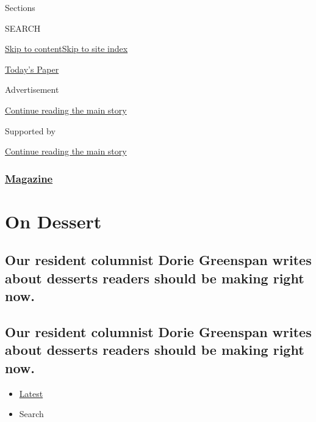 Sections

SEARCH

\protect\hyperlink{site-content}{Skip to
content}\protect\hyperlink{site-index}{Skip to site index}

\href{https://myaccount.nytimes3xbfgragh.onion/auth/login?response_type=cookie\&client_id=vi}{}

\href{https://www.nytimes3xbfgragh.onion/section/todayspaper}{Today's
Paper}

Advertisement

\protect\hyperlink{after-top}{Continue reading the main story}

Supported by

\protect\hyperlink{after-sponsor}{Continue reading the main story}

\hypertarget{magazine}{%
\subsubsection{\texorpdfstring{\href{/section/magazine}{Magazine}}{Magazine}}\label{magazine}}

\hypertarget{on-dessert}{%
\section{On Dessert}\label{on-dessert}}

\hypertarget{our-resident-columnist-dorie-greenspan-writes-about-desserts-readers-should-be-making-right-now}{%
\subsection{Our resident columnist Dorie Greenspan writes about desserts
readers should be making right
now.}\label{our-resident-columnist-dorie-greenspan-writes-about-desserts-readers-should-be-making-right-now}}

\hypertarget{our-resident-columnist-dorie-greenspan-writes-about-desserts-readers-should-be-making-right-now-1}{%
\subsection{Our resident columnist Dorie Greenspan writes about desserts
readers should be making right
now.}\label{our-resident-columnist-dorie-greenspan-writes-about-desserts-readers-should-be-making-right-now-1}}

\begin{itemize}
\tightlist
\item
  \protect\hyperlink{stream-panel}{Latest}
\item
  Search
\end{itemize}

